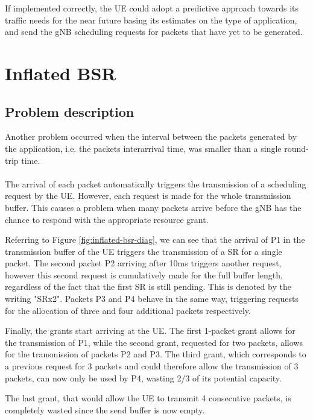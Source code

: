 If implemented correctly, the \ac{UE} could adopt a predictive approach towards its traffic needs for the near future basing its estimates on the type of application, and send the \ac{gNB} scheduling requests for packets that have yet to be generated.

\section{Inflated BSR}
\label{sec:inf-bsr}

\subsection{Problem description}
Another problem occurred when the interval between the packets generated by the application, i.e. the packets interarrival time, was smaller than a single round-trip time. 

\paragraph{}
The arrival of each packet automatically triggers the transmission of a scheduling request by the \ac{UE}. However, each request is made for the whole transmission buffer. This causes a problem when many packets arrive before the \ac{gNB} has the chance to respond with the appropriate resource grant.

Referring to Figure \ref{fig:inflated-bsr-diag}, we can see that the arrival of P1 in the transmission buffer of the \ac{UE} triggers the transmission of a \ac{SR} for a single packet. The second packet P2 arriving after 10ms triggers another request, however this second request is cumulatively made for the full buffer length, regardless of the fact that the first \ac{SR} is still pending. This is denoted by the writing "SRx2". Packets P3 and P4 behave in the same way, triggering requests for the allocation of three and four additional packets respectively.

Finally, the grants start arriving at the \ac{UE}. The first 1-packet grant allows for the transmission of P1, while the second grant, requested for two packets, allows for the transmission of packets P2 and P3. The third grant, which corresponds to a previous request for 3 packets and could therefore allow the transmission of 3 packets, can now only be used by P4, wasting 2/3 of its potential capacity. 

The last grant, that would allow the \ac{UE} to transmit 4 consecutive packets, is completely wasted since the send buffer is now empty.

